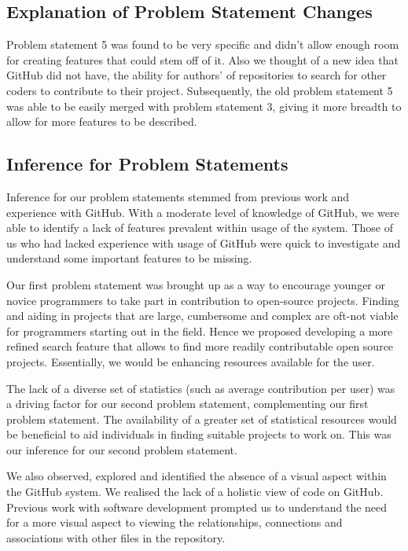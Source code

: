 \documentclass[12pt]{article}
\begin{document}
\vfill
\subsection{Explanation of Problem Statement Changes}
Problem statement 5 was found to be very specific and didn't allow enough room for creating features that could stem off of it. Also we thought of a new idea that GitHub did not have, the ability for authors' of repositories to search for other coders to contribute to their project. Subsequently, the old problem statement 5 was able to be easily merged with problem statement 3, giving it more breadth to allow for more features to be described.

\subsection{Inference for Problem Statements}
Inference for our problem statements stemmed from previous work and experience with \textsf{GitHub}. With a moderate level of knowledge of \textsf{GitHub}, we were able to identify a lack of features prevalent within usage of the system. Those of us who had lacked experience with usage of \textsf{GitHub} were quick to investigate and understand some important features to be missing.

Our first problem statement was brought up as a way to encourage younger or novice programmers to take part in contribution to open-source projects. Finding and aiding in projects that are large, cumbersome and complex are oft-not viable for programmers starting out in the field. Hence we proposed developing a more refined search feature that allows to find more readily contributable open source projects. Essentially, we would be enhancing resources available for the user.

The lack of a diverse set of statistics (such as average contribution per user) was a driving factor for our second problem statement, complementing our first problem statement. The availability of a greater set of statistical resources would be beneficial to aid individuals in finding suitable projects to work on. This was our inference for our second problem statement.

We also observed, explored and identified the absence of a visual aspect within the \textsf{GitHub} system. We realised the lack of a holistic view of code on \textsf{GitHub}. Previous work with software development prompted us to understand the need for a more visual aspect to viewing the relationships, connections and associations with other files in the repository.
\end{document}
